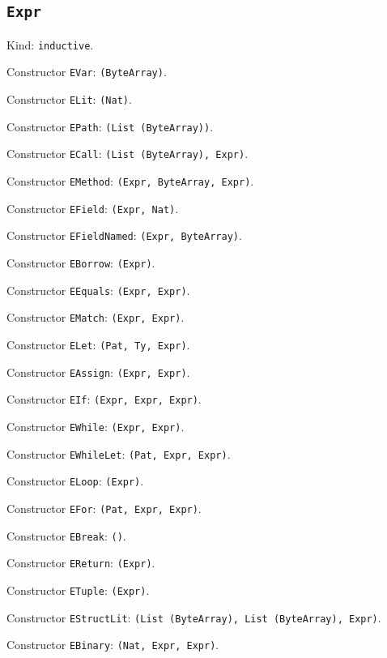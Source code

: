 \documentclass[11pt]{article}
\begin{document}
\subsection*{\texttt{Expr}}
\noindent Kind: \texttt{inductive}.\par
\noindent Constructor \texttt{EVar}: \texttt{(ByteArray)}.\par
\noindent Constructor \texttt{ELit}: \texttt{(Nat)}.\par
\noindent Constructor \texttt{EPath}: \texttt{(List (ByteArray))}.\par
\noindent Constructor \texttt{ECall}: \texttt{(List (ByteArray), Expr)}.\par
\noindent Constructor \texttt{EMethod}: \texttt{(Expr, ByteArray, Expr)}.\par
\noindent Constructor \texttt{EField}: \texttt{(Expr, Nat)}.\par
\noindent Constructor \texttt{EFieldNamed}: \texttt{(Expr, ByteArray)}.\par
\noindent Constructor \texttt{EBorrow}: \texttt{(Expr)}.\par
\noindent Constructor \texttt{EEquals}: \texttt{(Expr, Expr)}.\par
\noindent Constructor \texttt{EMatch}: \texttt{(Expr, Expr)}.\par
\noindent Constructor \texttt{ELet}: \texttt{(Pat, Ty, Expr)}.\par
\noindent Constructor \texttt{EAssign}: \texttt{(Expr, Expr)}.\par
\noindent Constructor \texttt{EIf}: \texttt{(Expr, Expr, Expr)}.\par
\noindent Constructor \texttt{EWhile}: \texttt{(Expr, Expr)}.\par
\noindent Constructor \texttt{EWhileLet}: \texttt{(Pat, Expr, Expr)}.\par
\noindent Constructor \texttt{ELoop}: \texttt{(Expr)}.\par
\noindent Constructor \texttt{EFor}: \texttt{(Pat, Expr, Expr)}.\par
\noindent Constructor \texttt{EBreak}: \texttt{()}.\par
\noindent Constructor \texttt{EReturn}: \texttt{(Expr)}.\par
\noindent Constructor \texttt{ETuple}: \texttt{(Expr)}.\par
\noindent Constructor \texttt{EStructLit}: \texttt{(List (ByteArray), List (ByteArray), Expr)}.\par
\noindent Constructor \texttt{EBinary}: \texttt{(Nat, Expr, Expr)}.\par
\end{document}
